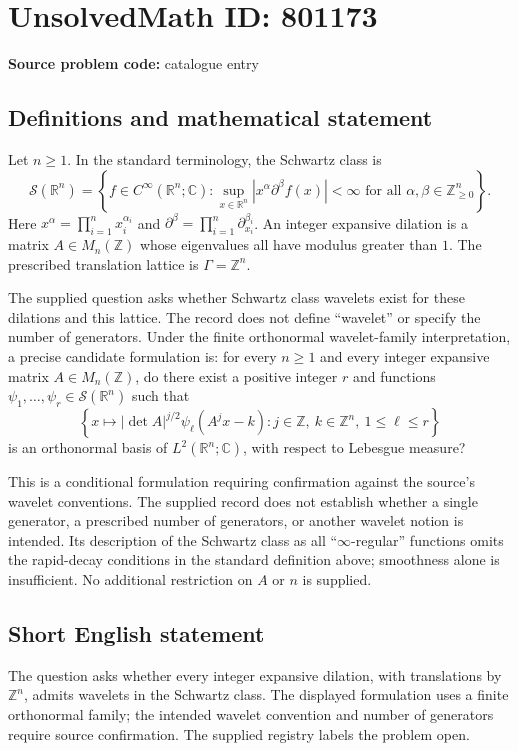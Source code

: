 \documentclass[11pt]{article}
\newcommand{\Z}{\mathbb{Z}}
\newcommand{\R}{\mathbb{R}}
\newcommand{\C}{\mathbb{C}}
\begin{document}
\section*{UnsolvedMath ID: 801173}
\textbf{Source problem code:} catalogue entry
\subsection{Definitions and mathematical statement}
Let \(n\geq 1\). In the standard terminology, the Schwartz class is
\[
\mathcal S(\R^n)=\left\{f\in C^\infty(\R^n;\C):\sup_{x\in\R^n}|x^\alpha\partial^\beta f(x)|<\infty\text{ for all }\alpha,\beta\in\Z_{\geq0}^n\right\}.
\]
Here \(x^\alpha=\prod_{i=1}^n x_i^{\alpha_i}\) and \(\partial^\beta=\prod_{i=1}^n\partial_{x_i}^{\beta_i}\). An integer expansive dilation is a matrix \(A\in M_n(\Z)\) whose eigenvalues all have modulus greater than \(1\). The prescribed translation lattice is \(\Gamma=\Z^n\).

The supplied question asks whether Schwartz class wavelets exist for these dilations and this lattice. The record does not define ``wavelet'' or specify the number of generators. Under the finite orthonormal wavelet-family interpretation, a precise candidate formulation is: for every \(n\geq1\) and every integer expansive matrix \(A\in M_n(\Z)\), do there exist a positive integer \(r\) and functions \(\psi_1,\ldots,\psi_r\in\mathcal S(\R^n)\) such that
\[
\left\{x\longmapsto |\det A|^{j/2}\psi_\ell(A^j x-k):j\in\Z,\ k\in\Z^n,\ 1\leq\ell\leq r\right\}
\]
is an orthonormal basis of \(L^2(\R^n;\C)\), with respect to Lebesgue measure?

This is a conditional formulation requiring confirmation against the source's wavelet conventions. The supplied record does not establish whether a single generator, a prescribed number of generators, or another wavelet notion is intended. Its description of the Schwartz class as all ``\(\infty\)-regular'' functions omits the rapid-decay conditions in the standard definition above; smoothness alone is insufficient. No additional restriction on \(A\) or \(n\) is supplied.
\subsection{Short English statement}
The question asks whether every integer expansive dilation, with translations by \(\Z^n\), admits wavelets in the Schwartz class. The displayed formulation uses a finite orthonormal family; the intended wavelet convention and number of generators require source confirmation. The supplied registry labels the problem open.
\end{document}
